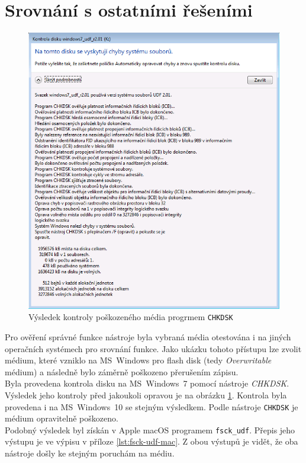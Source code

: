 \section{Srovnání s ostatními řešeními}
\label{sec:srovnani}
\begin{figure}[] 
    \centering
    \includegraphics[scale=0.38]{obrazky/chkdsk.png}
    \caption{Výsledek kontroly poškozeného média progrmem \texttt{CHKDSK}}
    \label{fig:chkdsk}
\end{figure}
Pro ověření správné funkce nástroje byla vybraná média otestována i na jiných operačních systémech pro srovnání funkce. Jako ukázku tohoto přístupu lze zvolit médium, které vzniklo na MS~Windows pro flash disk (tedy \textit{Overwritable} médium) a následně bylo záměrně poškozeno přerušením zápisu.\\
Byla provedena kontrola disku na MS~Windows~7 pomocí nástroje \textit{CHKDSK}. Výsledek jeho kontroly před jakoukoli opravou je na obrázku \ref{fig:chkdsk}. Kontrola byla provedena i na MS~Windows~10 se stejným výsledkem. Podle nástroje \texttt{CHKDSK} je médium opravitelně poškozeno.\\
Podobný výsledek byl získán v Apple macOS programem \texttt{fsck\_udf}. Přepis jeho výstupu je ve výpisu v příloze \ref{lst:fsck-udf-mac}. Z obou výstupů je vidět, že oba nástroje došly ke stejným poruchám na médiu.
